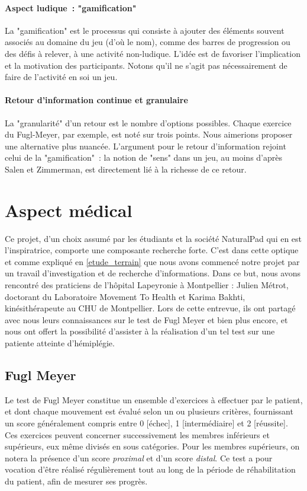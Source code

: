 \documentclass[french,12pt]{report}
\begin{document}
		\subsubsection{Aspect ludique~: "gamification"}
		La "gamification" est le processus qui consiste à ajouter des éléments 
		souvent associés au domaine du jeu (d'où le nom), comme des barres de
		progression ou des défis à relever, à une activité non-ludique. L'idée est 
		de favoriser l'implication et la motivation des participants. 
		Notons qu'il ne s'agit pas nécessairement de faire de l'activité en soi un 
		jeu.
    \subsubsection{Retour d'information continue et granulaire}
    La "granularité" d'un retour est le nombre d'options possibles. 
    Chaque exercice du Fugl-Meyer, par exemple, est noté sur trois points. Nous 
    aimerions proposer une alternative plus nuancée.
    L'argument pour le retour d'information rejoint celui de la "gamification"~:
    la notion de "sens" dans un jeu, au moins d'après Salen et Zimmerman, est 
    directement lié à la richesse de ce retour.

	\chapter{Aspect médical}\label{lapeyronie}		%
Ce projet, d'un choix assumé par les étudiants et la société NaturalPad qui en est l'inspiratrice, comporte une composante recherche forte. C'est dans cette optique et comme expliqué en \ref{etude_terrain} que nous avons commencé notre projet par un travail d'investigation et de recherche d'informations. Dans ce but, nous avons rencontré des praticiens de l'hôpital Lapeyronie à Montpellier : Julien Métrot, doctorant du Laboratoire Movement To Health et Karima Bakhti, kinésithérapeute au CHU de Montpellier. Lors de cette entrevue, ils ont partagé avec nous leurs connaissances sur le test de Fugl Meyer et bien plus encore, et nous ont offert la possibilité d'assister à la réalisation d'un tel test sur une patiente atteinte d'hémiplégie.
	\section{Fugl Meyer}\label{fugl_meyer}
Le test de Fugl Meyer constitue un ensemble d'exercices à effectuer par le patient, et dont chaque mouvement est évalué selon un ou plusieurs critères, fournissant un score généralement compris entre 0 [échec], 1 [intermédiaire] et 2 [réussite]. Ces exercices peuvent concerner successivement les membres inférieurs et supérieurs, eux même divisés en sous catégories. Pour les membres supérieurs, on notera la présence d'un score \textit{proximal} et d'un score \textit{distal}. Ce test a pour vocation d'être réalisé régulièrement tout au long de la période de réhabilitation du patient, afin de mesurer ses progrès.
\end{document}
